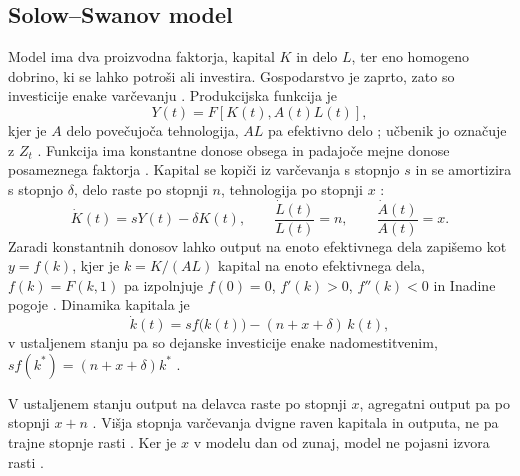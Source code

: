 \documentclass[12pt,a4paper]{article}
\begin{document}
\subsection{Solow--Swanov model}\label{sec:solow}
Model ima dva proizvodna faktorja, kapital $K$ in delo $L$, ter eno homogeno dobrino, ki se lahko potroši ali investira. Gospodarstvo je zaprto, zato so investicije enake varčevanju \parencite[str.~9]{polanec_rast}. Produkcijska funkcija je
\begin{equation}\label{eq:prod}
Y(t)=F\left[K(t),A(t)L(t)\right],
\end{equation}
kjer je $A$ delo povečujoča tehnologija, $AL$ pa efektivno delo \parencite[str.~10]{polanec_rast}; učbenik jo označuje z $Z_t$ \parencite[str.~108--109]{garin2021}. Funkcija ima konstantne donose obsega in padajoče mejne donose posameznega faktorja \parencites[str.~10--11]{polanec_rast}[str.~109]{garin2021}. Kapital se kopiči iz varčevanja s stopnjo $s$ in se amortizira s stopnjo $\delta$, delo raste po stopnji $n$, tehnologija po stopnji $x$ \parencite[str.~10]{polanec_rast}:
\begin{equation}\label{eq:akum}
\dot K(t)=sY(t)-\delta K(t),\qquad \frac{\dot L(t)}{L(t)}=n,\qquad \frac{\dot A(t)}{A(t)}=x.
\end{equation}
Zaradi konstantnih donosov lahko output na enoto efektivnega dela zapišemo kot $y=f(k)$, kjer je $k=K/(AL)$ kapital na enoto efektivnega dela, $f(k)=F(k,1)$ pa izpolnjuje $f(0)=0$, $f'(k)>0$, $f''(k)<0$ in Inadine pogoje \parencite[str.~11--12]{polanec_rast}. Dinamika kapitala je
\begin{equation}\label{eq:k}
\dot k(t)=s f\bigl(k(t)\bigr)-(n+x+\delta)\,k(t),
\end{equation}
v ustaljenem stanju pa so dejanske investicije enake nadomestitvenim, $s f(k^*)=(n+x+\delta)k^*$ \parencite[str.~12--13]{polanec_rast}.

V ustaljenem stanju output na delavca raste po stopnji $x$, agregatni output pa po stopnji $x+n$ \parencites[str.~13]{polanec_rast}[str.~130]{garin2021}. Višja stopnja varčevanja dvigne raven kapitala in outputa, ne pa trajne stopnje rasti \parencites[str.~13--14]{polanec_rast}[str.~108]{garin2021}. Ker je $x$ v modelu dan od zunaj, model ne pojasni izvora rasti \parencites[str.~18]{polanec_rast}[str.~129]{garin2021}.
\end{document}

